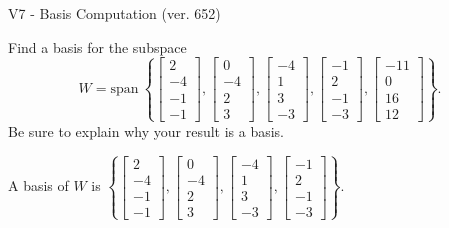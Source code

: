 \begin{exercise}
  \begin{exerciseTitle}V7 - Basis Computation (ver. 652)\end{exerciseTitle}
  \begin{exerciseStatement}
    Find a basis for the subspace 
\[W=\mathrm{span}\ \left\{\left[\begin{array}{r}
2 \\
-4 \\
-1 \\
-1
\end{array}\right] , \left[\begin{array}{r}
0 \\
-4 \\
2 \\
3
\end{array}\right] , \left[\begin{array}{r}
-4 \\
1 \\
3 \\
-3
\end{array}\right] , \left[\begin{array}{r}
-1 \\
2 \\
-1 \\
-3
\end{array}\right] , \left[\begin{array}{r}
-11 \\
0 \\
16 \\
12
\end{array}\right]\right\}.\]
 Be sure to explain why your result is a basis.


  \end{exerciseStatement}
  \begin{exerciseAnswer}
   A basis of \(W\) is  \(\left\{\left[\begin{array}{r}
2 \\
-4 \\
-1 \\
-1
\end{array}\right] , \left[\begin{array}{r}
0 \\
-4 \\
2 \\
3
\end{array}\right] , \left[\begin{array}{r}
-4 \\
1 \\
3 \\
-3
\end{array}\right] , \left[\begin{array}{r}
-1 \\
2 \\
-1 \\
-3
\end{array}\right]\right\}\).
  


  \end{exerciseAnswer}
\end{exercise}